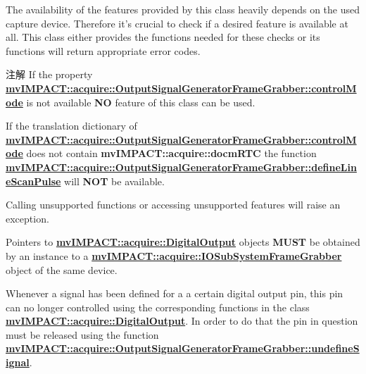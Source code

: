 The availability of the features provided by this class heavily depends on the used capture device. Therefore it's crucial to check if a desired feature is available at all. This class either provides the functions needed for these checks or its functions will return appropriate error codes.

\begin{DoxyNote}{注解}
If the property {\bfseries \hyperlink{classmv_i_m_p_a_c_t_1_1acquire_1_1_output_signal_generator_frame_grabber_a16a2f8eea50086e015adb7e40088e765}{mv\+I\+M\+P\+A\+C\+T\+::acquire\+::\+Output\+Signal\+Generator\+Frame\+Grabber\+::control\+Mode}} is not available {\bfseries N\+O} feature of this class can be used.

If the translation dictionary of {\bfseries \hyperlink{classmv_i_m_p_a_c_t_1_1acquire_1_1_output_signal_generator_frame_grabber_a16a2f8eea50086e015adb7e40088e765}{mv\+I\+M\+P\+A\+C\+T\+::acquire\+::\+Output\+Signal\+Generator\+Frame\+Grabber\+::control\+Mode}} does not contain {\bfseries mv\+I\+M\+P\+A\+C\+T\+::acquire\+::docm\+R\+T\+C} the function {\bfseries \hyperlink{classmv_i_m_p_a_c_t_1_1acquire_1_1_output_signal_generator_frame_grabber_a1bb27162093ef2ed424036cb7a129da5}{mv\+I\+M\+P\+A\+C\+T\+::acquire\+::\+Output\+Signal\+Generator\+Frame\+Grabber\+::define\+Line\+Scan\+Pulse}} will {\bfseries N\+O\+T} be available.

Calling unsupported functions or accessing unsupported features will raise an exception.
\end{DoxyNote}
Pointers to {\bfseries \hyperlink{classmv_i_m_p_a_c_t_1_1acquire_1_1_digital_output}{mv\+I\+M\+P\+A\+C\+T\+::acquire\+::\+Digital\+Output}} objects {\bfseries M\+U\+S\+T} be obtained by an instance to a {\bfseries \hyperlink{classmv_i_m_p_a_c_t_1_1acquire_1_1_i_o_sub_system_frame_grabber}{mv\+I\+M\+P\+A\+C\+T\+::acquire\+::\+I\+O\+Sub\+System\+Frame\+Grabber}} object of the same device.

Whenever a signal has been defined for a a certain digital output pin, this pin can no longer controlled using the corresponding functions in the class {\bfseries \hyperlink{classmv_i_m_p_a_c_t_1_1acquire_1_1_digital_output}{mv\+I\+M\+P\+A\+C\+T\+::acquire\+::\+Digital\+Output}}. In order to do that the pin in question must be released using the function {\bfseries \hyperlink{classmv_i_m_p_a_c_t_1_1acquire_1_1_output_signal_generator_frame_grabber_a4311d27a250b52f733074778a31ac822}{mv\+I\+M\+P\+A\+C\+T\+::acquire\+::\+Output\+Signal\+Generator\+Frame\+Grabber\+::undefine\+Signal}}.

